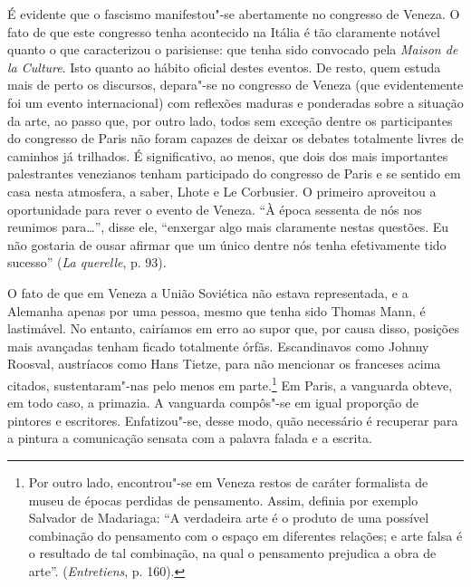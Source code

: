 É evidente que o fascismo manifestou"-se abertamente no congresso de
Veneza. O fato de que este congresso tenha acontecido na Itália é tão
claramente notável quanto o que caracterizou o parisiense: que tenha
sido convocado pela \emph{Maison de la Culture}. Isto quanto ao hábito
oficial destes eventos. De resto, quem estuda mais de perto os
discursos, depara"-se no congresso de Veneza (que evidentemente foi um
evento internacional) com reflexões maduras e ponderadas sobre a
situação da arte, ao passo que, por outro lado, todos sem exceção dentre
os participantes do congresso de Paris não foram capazes de deixar os
debates totalmente livres de caminhos já trilhados. É significativo, ao
menos, que dois dos mais importantes palestrantes venezianos tenham
participado do congresso de Paris e se sentido em casa nesta atmosfera,
a saber, Lhote e Le Corbusier. O primeiro aproveitou a oportunidade para
rever o evento de Veneza. ``À época sessenta de nós nos reunimos
para\ldots{}'', disse ele, ``enxergar algo mais claramente nestas questões.
Eu não gostaria de ousar afirmar que um único dentre nós tenha
efetivamente tido sucesso'' (\emph{La querelle}, p. 93).

O fato de que em Veneza a União Soviética não estava representada, e a
Alemanha apenas por uma pessoa, mesmo que tenha sido Thomas Mann, é
lastimável. No entanto, cairíamos em erro ao supor que, por causa disso,
posições mais avançadas tenham ficado totalmente órfãs. Escandinavos
como Johnny Roosval, austríacos como Hans Tietze, para não mencionar os
franceses acima citados, sustentaram"-nas pelo menos em parte.\footnote{Por
  outro lado, encontrou"-se em Veneza restos de caráter formalista de
  museu de épocas perdidas de pensamento. Assim, definia por exemplo
  Salvador de Madariaga: ``A verdadeira arte é o produto de uma possível
  combinação do pensamento com o espaço em diferentes relações; e arte
  falsa é o resultado de tal combinação, na qual o pensamento prejudica
  a obra de arte''. (\emph{Entretiens}, p. 160).} Em Paris, a vanguarda
obteve, em todo caso, a primazia. A vanguarda compôs"-se em igual
proporção de pintores e escritores. Enfatizou"-se, desse modo, quão
necessário é recuperar para a pintura a comunicação sensata com a
palavra falada e a escrita.

